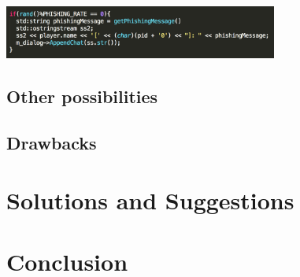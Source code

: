 \documentclass[conference]{IEEEtran}
\begin{document}
\vspace{0.5cm}
\begin{center}
\includegraphics[width=9cm]{Figures/Phishing2}
\end{center}
\vspace{0.5cm}

\subsection{Other possibilities}
\subsection{Drawbacks}

\section{Solutions and Suggestions}

\section{Conclusion}








%
%
%




\end{document}
